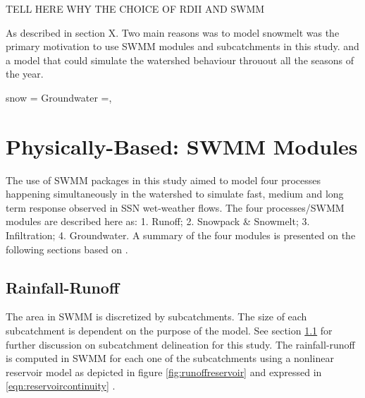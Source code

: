 
TELL HERE WHY THE CHOICE OF RDII AND SWMM

As described in section X. Two main reasons was to model snowmelt was the primary motivation to use SWMM modules and subcatchments in this study. and a model that could simulate the watershed behaviour throuout all the seasons of the year. 

snow = \citet{muthanna2015}
Groundwater =\citet{Robinson2015}, \citet{Moore2017}


\section{Physically-Based: SWMM Modules}

The use of SWMM packages in this study aimed to model four processes happening simultaneously in the watershed to simulate fast, medium and long term response observed in \ac{SSN} wet-weather flows. The four processes/SWMM modules are described here as: 1. Runoff; 2. Snowpack \& Snowmelt; 3. Infiltration; 4. Groundwater. A summary of the four modules is presented on the following sections based on \citet{Rossman2016}. 


\subsection{Rainfall-Runoff} 

The area in SWMM is discretized by subcatchments. The size of each subcatchment is dependent on the purpose of the model. See section \ref{} for further discussion on subcatchment delineation for this study.
The rainfall-runoff is computed in SWMM for each one of the subcatchments using a nonlinear reservoir model as depicted in figure \ref{fig:runoffreservoir} and expressed in \ref{eqn:reservoircontinuity} \cite{Rossman2016}. 

